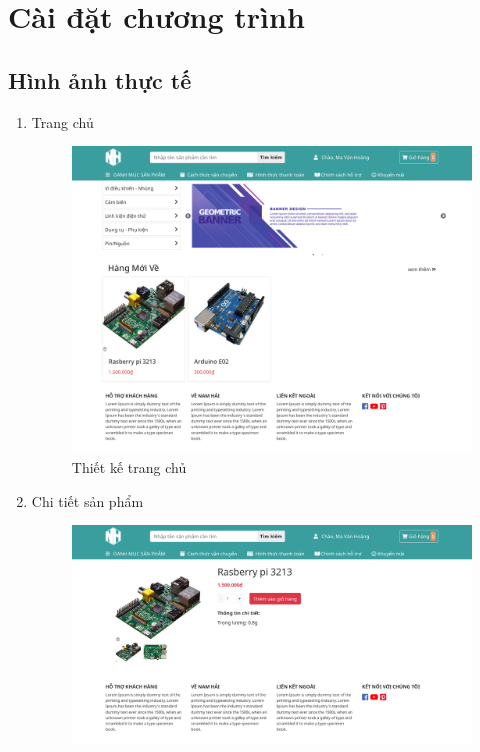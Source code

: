 \chapter{Cài đặt chương trình}
\section{Hình ảnh thực tế}
\begin{enumerate}[label=\textbf{\alph*)}]
	\item Trang chủ
	      \begin{figure}[h!]
		      \centering
		      \includegraphics[scale=0.27]{fig/r_home.png}
		      \caption{Thiết kế trang chủ}
	      \end{figure}
	\item Chi tiết sản phẩm
	      \begin{figure}[h!]
		      \centering
		      \includegraphics[scale=0.27]{fig/r_product_details.png}

\end{figure}
\end{enumerate}
